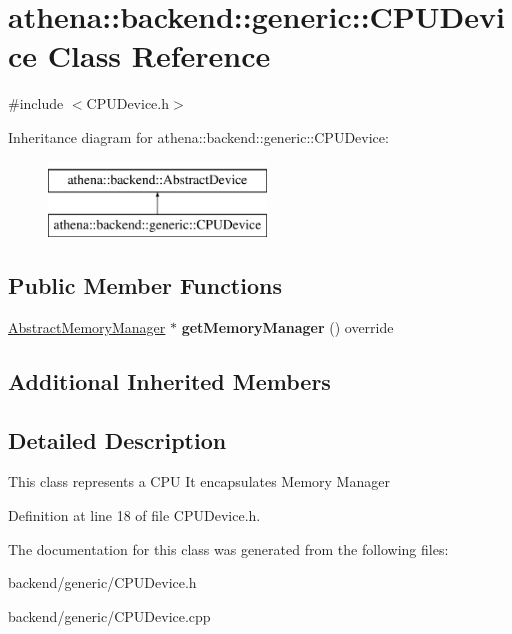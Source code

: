 \hypertarget{classathena_1_1backend_1_1generic_1_1_c_p_u_device}{}\section{athena\+:\+:backend\+:\+:generic\+:\+:C\+P\+U\+Device Class Reference}
\label{classathena_1_1backend_1_1generic_1_1_c_p_u_device}


{\ttfamily \#include $<$C\+P\+U\+Device.\+h$>$}

Inheritance diagram for athena\+:\+:backend\+:\+:generic\+:\+:C\+P\+U\+Device\+:\begin{figure}[H]
\begin{center}
\leavevmode
\includegraphics[height=2.000000cm]{db/d7b/classathena_1_1backend_1_1generic_1_1_c_p_u_device}
\end{center}
\end{figure}
\subsection*{Public Member Functions}
\begin{DoxyCompactItemize}
\item 
\mbox{\label{classathena_1_1backend_1_1generic_1_1_c_p_u_device_a813561ea04e66b4fc25c720242c70238}} 
\mbox{\hyperlink{classathena_1_1backend_1_1_abstract_memory_manager}{Abstract\+Memory\+Manager}} $\ast$ {\bfseries get\+Memory\+Manager} () override
\end{DoxyCompactItemize}
\subsection*{Additional Inherited Members}


\subsection{Detailed Description}
This class represents a C\+PU It encapsulates Memory Manager 

Definition at line 18 of file C\+P\+U\+Device.\+h.



The documentation for this class was generated from the following files\+:\begin{DoxyCompactItemize}
\item 
backend/generic/C\+P\+U\+Device.\+h\item 
backend/generic/C\+P\+U\+Device.\+cpp\end{DoxyCompactItemize}
